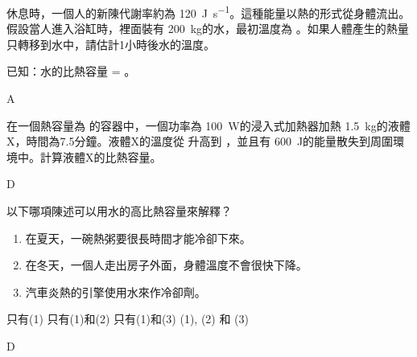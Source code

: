 {
    休息時，一個人的新陳代謝率約為 \qty{120}{J.s^{-1}}。這種能量以熱的形式從身體流出。假設當人進入浴缸時，裡面裝有 \qty{200}{kg}的水，最初溫度為 。如果人體產生的熱量只轉移到水中，請估計1小時後水的溫度。
    \par 已知：水的比熱容量 = 。
    \begin{choices}
        \CorrectChoice {}
        \choice {}
        \choice {}
        \choice {}
    \end{choices}
}{\mckey A}

{
    在一個熱容量為 的容器中，一個功率為 \qty{100}{W}的浸入式加熱器加熱 \qty{1.5}{kg}的液體X，時間為7.5分鐘。液體X的溫度從 升高到 ，並且有 \qty{600}{J}的能量散失到周圍環境中。計算液體X的比熱容量。
    \begin{choices}
        \choice {}
        \choice {}
        \choice {}
        \CorrectChoice {}
    \end{choices}
}{\mckey D}

{
    以下哪項陳述可以用水的高比熱容量來解釋？
    \begin{enumerate}[label=\sd]
        \item 在夏天，一碗熱粥要很長時間才能冷卻下來。
        \item 在冬天，一個人走出房子外面，身體溫度不會很快下降。
        \item 汽車炎熱的引擎使用水來作冷卻劑。
    \end{enumerate}
    \begin{choices}
        \choice 只有(1)
        \choice 只有(1)和(2)
        \choice 只有(1)和(3)
        \CorrectChoice (1), (2) 和 (3)
    \end{choices}
}{\mckey D}

